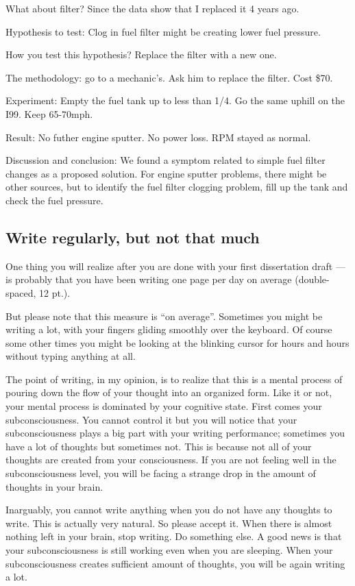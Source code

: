 \documentclass[11pt]{article}
\begin{document}
What about filter? Since the data show that I replaced it 4 years ago.

Hypothesis to test: Clog in fuel filter might be creating lower fuel pressure.

How you test this hypothesis? Replace the filter with a new one.

The methodology: go to a mechanic's. Ask him to replace the filter. Cost \$70.

Experiment: Empty the fuel tank up to less than 1/4. Go the same uphill on the
I99. Keep 65-70mph.

Result: No futher engine sputter. No power loss. RPM stayed as normal.

Discussion and conclusion: We found a symptom related to simple fuel filter
changes as a proposed solution. For engine sputter problems, there might be
other sources, but to identify the fuel filter clogging problem, fill up the
tank and check the fuel pressure.



\subsection{Write regularly, but not that much}
One thing you will realize after you are done with your first dissertation
draft --- is probably that you have been writing one page per day on average
(double-spaced, 12 pt.).

But please note that this measure is ``on average''. Sometimes you might be
writing a lot, with your fingers gliding smoothly over the keyboard.  Of
course some other times you might be looking at the blinking cursor for hours
and hours without typing anything at all. 

The point of writing, in my opinion, is to realize that this is a mental
process of pouring down the flow of your thought into an organized form.  Like
it or not, your mental process is dominated by your cognitive state.  First
comes your subconsciousness. You cannot control it but you will notice
that your subconsciousness plays a big part with your writing performance;
sometimes you have a lot of thoughts but sometimes not.  This is because not
all of your thoughts are created from your consciousness. If you are not
feeling well in the subconsciousness level, you will be facing a strange
drop in the amount of thoughts in your brain.

Inarguably, you cannot write anything when you do not have any thoughts to
write. This is actually very natural. So please accept it. When there is
almost nothing left in your brain, stop writing. Do something else. A good
news is that your subconsciousness is still working even when you are
sleeping. When your subconsciousness creates sufficient amount of thoughts,
you will be again writing a lot. 
\end{document}
